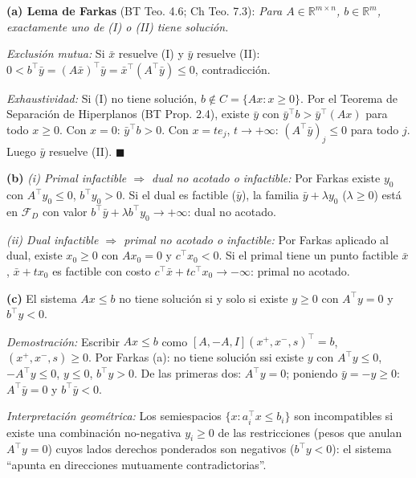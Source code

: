 \documentclass[12pt]{article}
\theoremstyle{plain}
\begin{document}
\begin{solucion}

\noindent\textbf{(a) Lema de Farkas} (BT Teo. 4.6; Ch Teo. 7.3): \textit{Para $A\in\mathbb{R}^{m\times n}$, $b\in\mathbb{R}^m$, exactamente uno de (I) o (II) tiene solución.}

\textit{Exclusión mutua:} Si $\bar{x}$ resuelve (I) y $\bar{y}$ resuelve (II): $0<b^\top\bar{y}=(A\bar{x})^\top\bar{y}=\bar{x}^\top(A^\top\bar{y})\leq 0$, contradicción.

\textit{Exhaustividad:} Si (I) no tiene solución, $b\notin C=\{Ax:x\geq 0\}$. Por el Teorema de Separación de Hiperplanos (BT Prop. 2.4), existe $\bar{y}$ con $\bar{y}^\top b>\bar{y}^\top(Ax)$ para todo $x\geq 0$. Con $x=0$: $\bar{y}^\top b>0$. Con $x=te_j$, $t\to+\infty$: $(A^\top\bar{y})_j\leq 0$ para todo $j$. Luego $\bar{y}$ resuelve (II). $\blacksquare$

\noindent\textbf{(b)} \textit{(i) Primal infactible $\Rightarrow$ dual no acotado o infactible:} Por Farkas existe $y_0$ con $A^\top y_0\leq 0$, $b^\top y_0>0$. Si el dual es factible ($\bar{y}$), la familia $\bar{y}+\lambda y_0$ ($\lambda\geq 0$) está en $\mathcal{F}_D$ con valor $b^\top\bar{y}+\lambda b^\top y_0\to+\infty$: dual no acotado.

\textit{(ii) Dual infactible $\Rightarrow$ primal no acotado o infactible:} Por Farkas aplicado al dual, existe $x_0\geq 0$ con $Ax_0=0$ y $c^\top x_0<0$. Si el primal tiene un punto factible $\bar{x}$, $\bar{x}+tx_0$ es factible con costo $c^\top\bar{x}+tc^\top x_0\to-\infty$: primal no acotado.

\noindent\textbf{(c)} El sistema $Ax\leq b$ no tiene solución si y solo si existe $y\geq 0$ con $A^\top y=0$ y $b^\top y<0$.

\textit{Demostración:} Escribir $Ax\leq b$ como $[A,-A,I](x^+,x^-,s)^\top=b$, $(x^+,x^-,s)\geq 0$. Por Farkas (a): no tiene solución ssi existe $y$ con $A^\top y\leq 0$, $-A^\top y\leq 0$, $y\leq 0$, $b^\top y>0$. De las primeras dos: $A^\top y=0$; poniendo $\bar{y}=-y\geq 0$: $A^\top\bar{y}=0$ y $b^\top\bar{y}<0$.

\textit{Interpretación geométrica:} Los semiespacios $\{x: a_i^\top x\leq b_i\}$ son incompatibles si existe una combinación no-negativa $y_i\geq 0$ de las restricciones (pesos que anulan $A^\top y=0$) cuyos lados derechos ponderados son negativos ($b^\top y<0$): el sistema ``apunta en direcciones mutuamente contradictorias''.

\end{solucion}
\end{document}
